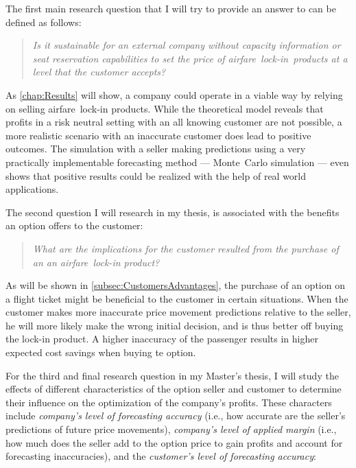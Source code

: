 The first main research question that I will try to provide an answer to can be defined as follows:

\begin{quote}\emph{Is it sustainable for an external company without capacity information or seat reservation capabilities to set the price of airfare~lock-in~products at a level that the customer accepts?}\end{quote}

As \autoref{chap:Results} will show, a company could operate in a viable way by relying on selling airfare~lock-in products. While the theoretical model reveals that profits in a risk neutral setting with an all knowing customer are not possible, a more realistic scenario with an inaccurate customer does lead to positive outcomes. The simulation with a seller making predictions using a very practically implementable forecasting method --- Monte~Carlo simulation --- even shows that positive results could be realized with the help of real world applications.

The second question I will research in my thesis, is associated with the benefits an option offers to the customer:

\begin{quote}\emph{What are the implications for the customer resulted from the purchase of an an airfare~lock-in product?}\end{quote}

As will be shown in \autoref{subsec:CustomersAdvantages}, the purchase of an option on a flight ticket might be beneficial to the customer in certain situations. When the customer makes more inaccurate price movement predictions relative to the seller, he will more likely make the wrong initial decision, and is thus better off buying the lock-in product. A higher inaccuracy of the passenger results in higher expected cost savings when buying te option.

For the third and final research question in my Master's thesis, I will study the effects of different characteristics of the option seller and customer to determine their influence on the optimization of the company's profits. These characters include \emph{company's level of forecasting accuracy} (i.e., how accurate are the seller's predictions of future price movements), \emph{company's level of applied margin} (i.e., how much does the seller add to the option price to gain profits and account for forecasting inaccuracies), and the \emph{customer's level of forecasting accuracy}:

